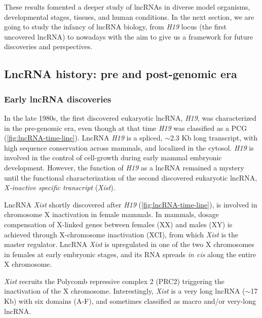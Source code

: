 These results fomented a deeper study of lncRNAs in diverse model organisms, developmental stages, tissues, and human conditions. In the next section, we are going to study the infancy of lncRNA biology, from \textit{H19} locus (the first uncovered lncRNA) to nowadays with the aim to give us a framework for future discoveries and perspectives.  

\clearpage

\subsection{LncRNA history: pre and post-genomic era}
\label{subsec:lncRNA-history}

\subsubsection{Early lncRNA discoveries}
\label{subsub:early_lncRNA_discoveries}

In the late 1980s, the first discovered eukaryotic lncRNA, \textit{H19}, was characterized in the pre-genomic era, even though at that time \textit{H19} was classified as a PCG\autocite{jarroux_2017_history} (\autoref{fig:lncRNA-time-line}). LncRNA \textit{H19} is a spliced, $\sim$2.3 Kb long transcript, with high sequence conservation across mammals, and localized in the cytosol. \textit{H19} is involved in the control of cell-growth during early mammal embryonic development.\autocite{jarroux_2017_history} However, the function of \textit{H19} as a lncRNA remained a mystery until the functional characterization of the second discovered eukaryotic lncRNA, \textit{X-inactive specific transcript} (\textit{Xist}).

LncRNA \textit{Xist} shortly discovered after \textit{H19} (\autoref{fig:lncRNA-time-line}), is involved in chromosome X inactivation in female mammals. In mammals, dosage compensation of X-linked genes between females (XX) and males (XY) is achieved through X-chromosome inactivation (XCI), from which \textit{Xist} is the master regulator.\autocite{loda_2019_xist} LncRNA \textit{Xist} is upregulated in one of the two X chromosomes in females at early embryonic stages, and its RNA spreads \textit{in cis} along the entire X chromosome.

\textit{Xist} recruits the Polycomb repressive complex 2 (PRC2) triggering the inactivation of the X chromosome.\autocite{jarroux_2017_history} Interestingly, \textit{Xist} is a very long lncRNA ($\sim$17 Kb) with six domains (A-F), and sometimes classified as macro and/or very-long lncRNA.\autocite{jarroux_2017_history}

